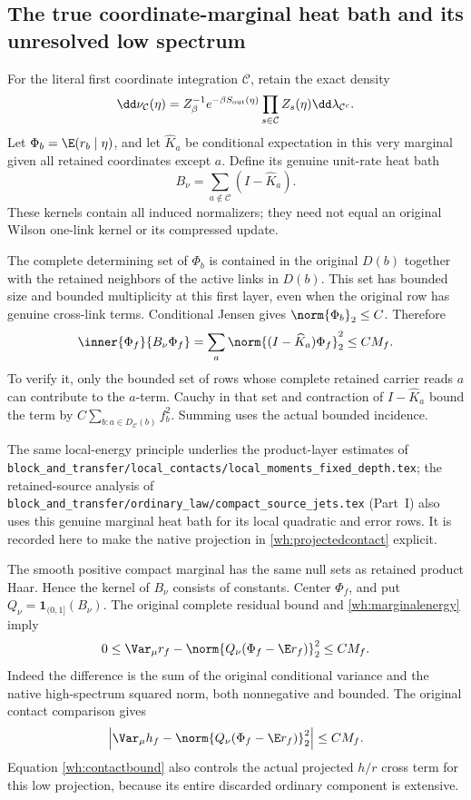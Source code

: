 \subsection{The true coordinate-marginal heat bath and its unresolved low spectrum}

For the literal first coordinate integration \(\mathcal C\), retain the exact density
\[
 \dd\nu_{\mathcal C}(\eta)
 =Z_\beta^{-1}e^{-\beta S_{\rm out}(\eta)}
       \prod_{s\in\mathcal C}Z_s(\eta)\dd\lambda_{\mathcal C^c}.
\]
Let \(\Phi_b=\E(r_b\mid\eta)\), and let \(\widehat K_a\) be conditional expectation in this very marginal given all retained coordinates except \(a\). Define its genuine unit-rate heat bath
\[
 B_\nu=\sum_{a\notin\mathcal C}(I-\widehat K_a).
\]
These kernels contain all induced normalizers; they need not equal an original Wilson one-link kernel or its compressed update.

The complete determining set of \(\Phi_b\) is contained in the original \(D(b)\) together with the retained neighbors of the active links in \(D(b)\). This set has bounded size and bounded multiplicity at this first layer, even when the original row has genuine cross-link terms. Conditional Jensen gives \(\norm{\Phi_b}_2\le C\). Therefore
\begin{equation}
 \inner{\Phi_f}{B_\nu\Phi_f}
 =\sum_a\norm{(I-\widehat K_a)\Phi_f}_2^2\le CM_f.
 \label{wh:marginalenergy}
\end{equation}
To verify it, only the bounded set of rows whose complete retained carrier reads \(a\) can contribute to the \(a\)-term. Cauchy in that set and contraction of \(I-\widehat K_a\) bound the term by \(C\sum_{b:a\in D_{\mathcal C}(b)}f_b^2\). Summing uses the actual bounded incidence.

The same local-energy principle underlies the product-layer estimates of \texttt{block\_and\_transfer/local\_contacts/local\_moments\_fixed\_depth.tex}; the retained-source analysis of \texttt{block\_and\_transfer/ordinary\_law/compact\_source\_jets.tex} (Part~I) also uses this genuine marginal heat bath for its local quadratic and error rows. It is recorded here to make the native projection in \eqref{wh:projectedcontact} explicit.

The smooth positive compact marginal has the same null sets as retained product Haar. Hence the kernel of \(B_\nu\) consists of constants. Center \(\Phi_f\), and put \(Q_\nu=\mathbf1_{(0,1]}(B_\nu)\). The original complete residual bound and \eqref{wh:marginalenergy} imply
\begin{equation}
 0\le
 \Var_\mu r_f-\norm{Q_\nu(\Phi_f-\E r_f)}_2^2
 \le CM_f.
 \label{wh:nativelow}
\end{equation}
Indeed the difference is the sum of the original conditional variance and the native high-spectrum squared norm, both nonnegative and bounded. The original contact comparison gives
\[
 \left|
 \Var_\mu h_f-\norm{Q_\nu(\Phi_f-\E r_f)}_2^2
 \right|\le CM_f.
\]
Equation \eqref{wh:contactbound} also controls the actual projected \(h/r\) cross term for this low projection, because its entire discarded ordinary component is extensive.

